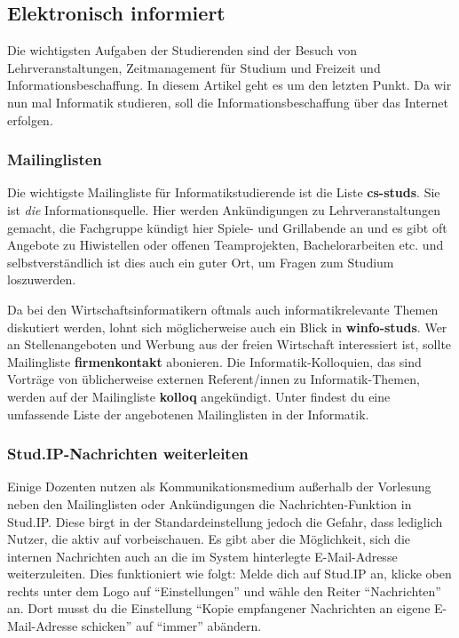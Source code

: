 
\subsection{Elektronisch informiert}
	\label{elekinf}
	Die wichtigsten Aufgaben der Studierenden sind der Besuch von Lehrveranstaltungen, Zeitmanagement für Studium und Freizeit und Informationsbeschaffung. In diesem Artikel geht es um den letzten Punkt. Da wir nun mal Informatik studieren, soll die Informationsbeschaffung über das Internet erfolgen.

	\subsubsection*{Mailinglisten}
	\label{mailinglisten}
		Die wichtigste Mailingliste für Informatikstudierende ist die Liste \textbf{cs-studs}. Sie ist \emph{die} Informationsquelle. Hier werden Ankündigungen zu Lehrveranstaltungen gemacht, die Fachgruppe kündigt hier Spiele- und Grillabende an und es gibt oft Angebote zu Hiwistellen oder offenen Teamprojekten, Bachelorarbeiten etc. und selbstverständlich ist dies auch ein guter Ort, um Fragen zum Studium loszuwerden.


		Da bei den Wirtschaftsinformatikern oftmals auch informatikrelevante Themen diskutiert werden, lohnt sich möglicherweise auch ein Blick in \textbf{winfo-studs}. 
		Wer an Stellenangeboten und Werbung aus der freien
		Wirtschaft interessiert ist, sollte Mailingliste
		\textbf{firmenkontakt} abonieren. Die
		Informatik-Kolloquien, das sind Vorträge von
		üblicherweise externen Referent/innen zu Informatik-Themen,
		werden auf der Mailingliste \textbf{kolloq} angekündigt.
		Unter
		findest du eine umfassende Liste der angebotenen Mailinglisten in der Informatik.

	\subsubsection*{Stud.IP-Nachrichten weiterleiten}
	\label{studipfwd}
	    Einige Dozenten nutzen als Kommunikationsmedium außerhalb der Vorlesung neben den Mailinglisten oder Ankündigungen die Nachrichten-Funktion in Stud.IP. Diese birgt in der Standardeinstellung jedoch die Gefahr, dass lediglich Nutzer, die aktiv auf  vorbeischauen.
    Es gibt aber die Möglichkeit, sich die internen Nachrichten auch an die im System hinterlegte E-Mail-Adresse weiterzuleiten. Dies funktioniert wie folgt: Melde dich auf Stud.IP an, klicke oben rechts unter dem Logo auf \enquote{Einstellungen} und wähle den Reiter \enquote{Nachrichten} an. Dort musst du die Einstellung \enquote{Kopie empfangener Nachrichten an eigene E-Mail-Adresse schicken} auf \enquote{immer} abändern. 

